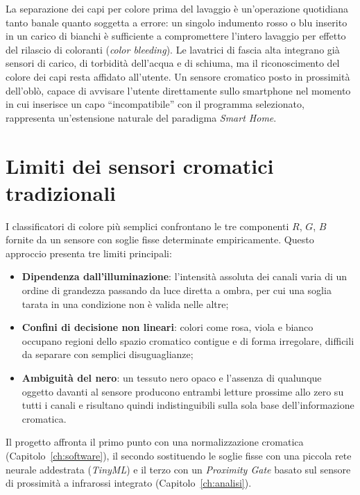 \documentclass[11pt,a4paper,twoside,openany]{report}
\begin{document}
La separazione dei capi per colore prima del lavaggio è un'operazione
quotidiana tanto banale quanto soggetta a errore: un singolo indumento
rosso o blu inserito in un carico di bianchi è sufficiente a compromettere
l'intero lavaggio per effetto del rilascio di coloranti (\textit{color
bleeding}). Le lavatrici di fascia alta integrano già sensori di carico,
di torbidità dell'acqua e di schiuma, ma il riconoscimento del colore dei
capi resta affidato all'utente. Un sensore cromatico posto in prossimità
dell'oblò, capace di avvisare l'utente direttamente sullo smartphone nel
momento in cui inserisce un capo \enquote{incompatibile} con il programma
selezionato, rappresenta un'estensione naturale del paradigma
\textit{Smart Home}.

\section{Limiti dei sensori cromatici tradizionali}

I classificatori di colore più semplici confrontano le tre componenti
$R$, $G$, $B$ fornite da un sensore con soglie fisse determinate
empiricamente. Questo approccio presenta tre limiti principali:

\begin{itemize}
  \item \textbf{Dipendenza dall'illuminazione}: l'intensità assoluta
        dei canali varia di un ordine di grandezza passando da luce
        diretta a ombra, per cui una soglia tarata in una condizione non
        è valida nelle altre;
  \item \textbf{Confini di decisione non lineari}: colori come rosa,
        viola e bianco occupano regioni dello spazio cromatico contigue
        e di forma irregolare, difficili da separare con semplici
        disuguaglianze;
  \item \textbf{Ambiguità del nero}: un tessuto nero opaco e l'assenza
        di qualunque oggetto davanti al sensore producono entrambi
        letture prossime allo zero su tutti i canali e risultano quindi
        indistinguibili sulla sola base dell'informazione cromatica.
\end{itemize}

Il progetto affronta il primo punto con una normalizzazione cromatica
(Capitolo~\ref{ch:software}), il secondo sostituendo le soglie fisse con
una piccola rete neurale addestrata (\textit{TinyML}) e il terzo con un
\textit{Proximity Gate} basato sul sensore di prossimità a infrarossi
integrato (Capitolo~\ref{ch:analisi}).
\end{document}
